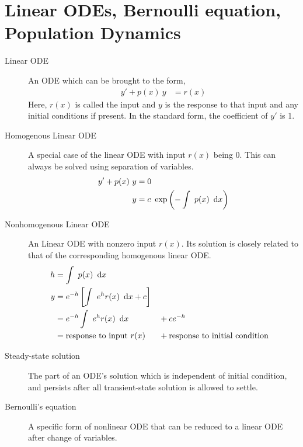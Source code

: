 \section{Linear ODEs, Bernoulli equation, Population Dynamics}

\begin{description}
    \item[Linear ODE] An ODE which can be brought to the form,
        \begin{align}
            y' + p(x)\ y & = r(x)
        \end{align}
        Here, $ r(x) $ is called the input and $ y $ is the response to that input and
        any initial conditions if present. In the standard form, the coefficient of
        $ y' $ is 1.
    \item[Homogenous Linear ODE] A special case of the linear ODE with input $ r(x) $ being 0. This can
        always be solved using separation of variables.
        \begin{align}
            y' + p(x)\ y & = 0                                        \\
            y            & = c\ \exp\left( -\int\ p(x)\ \dl x \right)
        \end{align}
    \item[Nonhomogenous Linear ODE] An Linear ODE with nonzero input $ r(x) $. Its solution
        is closely related to that of the corresponding homogenous linear ODE.
        \begin{align}
            h & = \int\ p(x)\ \dl x                                                                            \\
            y & = e^{-h}\left[ \int\ e^{h} r(x)\ \dl x + c \right]                                             \\
              & = e^{-h}\int\ e^{h} r(x)\ \dl x                    &  & + ce^{-h}                              \\
              & = \text{response to input}\ r(x)                   &  & + \text{response to initial condition}
        \end{align}
    \item[Steady-state solution] The part of an ODE's solution which is independent of initial
        condition, and persists after all transient-state solution is allowed to settle.
    \item[Bernoulli's equation] A specific form of nonlinear ODE that can be reduced to a
        linear ODE after change of variables.
        \begin{align}

\end{align}
\end{description}
